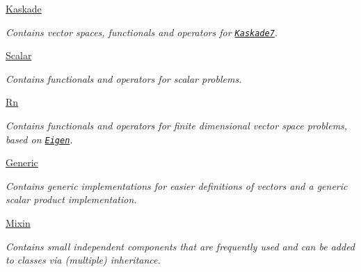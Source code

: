 \begin{DoxyCompactItemize}
\hyperlink{namespaceSpacy_1_1Kaskade}{Kaskade}
\begin{DoxyCompactList}\small\item\em Contains vector spaces, functionals and operators for \href{http://www.zib.de/projects/kaskade7-finite-element-toolbox}{\tt Kaskade7}. \end{DoxyCompactList}\item 
\hyperlink{namespaceSpacy_1_1Scalar}{Scalar}
\begin{DoxyCompactList}\small\item\em Contains functionals and operators for scalar problems. \end{DoxyCompactList}\item 
\hyperlink{namespaceSpacy_1_1Rn}{Rn}
\begin{DoxyCompactList}\small\item\em Contains functionals and operators for finite dimensional vector space problems, based on \href{http://eigen.tuxfamily.org}{\tt Eigen}. \end{DoxyCompactList}\item 
\hyperlink{namespaceSpacy_1_1Generic}{Generic}
\begin{DoxyCompactList}\small\item\em Contains generic implementations for easier definitions of vectors and a generic scalar product implementation. \end{DoxyCompactList}\item 
\hyperlink{namespaceSpacy_1_1Mixin}{Mixin}
\begin{DoxyCompactList}\small\item\em Contains small independent components that are frequently used and can be added to classes via (multiple) inheritance. \end{DoxyCompactList}\end{DoxyCompactItemize}
